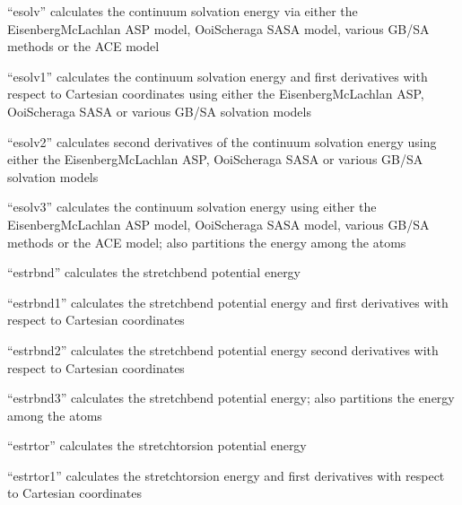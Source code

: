 \documentclass[letterpaper,11pt,english]{sphinxmanual}
\begin{document}

“esolv” calculates the continuum solvation energy via either the Eisenberg\sphinxhyphen{}McLachlan ASP model, Ooi\sphinxhyphen{}Scheraga SASA model, various GB/SA methods or the ACE model


“esolv1” calculates the continuum solvation energy and first derivatives with respect to Cartesian coordinates using either the Eisenberg\sphinxhyphen{}McLachlan ASP, Ooi\sphinxhyphen{}Scheraga SASA or various GB/SA solvation models


“esolv2” calculates second derivatives of the continuum solvation energy using either the Eisenberg\sphinxhyphen{}McLachlan ASP, Ooi\sphinxhyphen{}Scheraga SASA or various GB/SA solvation models


“esolv3” calculates the continuum solvation energy using either the Eisenberg\sphinxhyphen{}McLachlan ASP model, Ooi\sphinxhyphen{}Scheraga SASA model, various GB/SA methods or the ACE model; also partitions the energy among the atoms


“estrbnd” calculates the stretch\sphinxhyphen{}bend potential energy


“estrbnd1” calculates the stretch\sphinxhyphen{}bend potential energy and first derivatives with respect to Cartesian coordinates


“estrbnd2” calculates the stretch\sphinxhyphen{}bend potential energy second derivatives with respect to Cartesian coordinates


“estrbnd3” calculates the stretch\sphinxhyphen{}bend potential energy; also partitions the energy among the atoms


“estrtor” calculates the stretch\sphinxhyphen{}torsion potential energy


“estrtor1” calculates the stretch\sphinxhyphen{}torsion energy and first derivatives with respect to Cartesian coordinates
\end{document}
